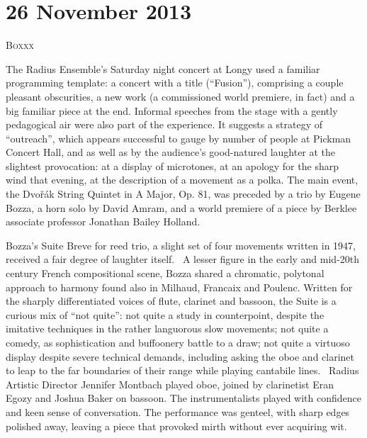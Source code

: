 \chapter{26 November 2013}

\textsc{Boxxx}

The Radius Ensemble’s Saturday night concert at Longy used a familiar programming template: a concert with a title (“Fusion”), comprising a couple pleasant obscurities, a new work (a commissioned world premiere, in fact) and a big familiar piece at the end. Informal speeches from the stage with a gently pedagogical air were also part of the experience. It suggests a strategy of “outreach”, which appears successful to gauge by number of people at Pickman Concert Hall, and as well as by the audience’s good-natured laughter at the slightest provocation: at a display of microtones, at an apology for the sharp wind that evening, at the description of a movement as a polka. The main event, the Dvořák String Quintet in A Major, Op. 81, was preceded by a trio by Eugene Bozza, a horn solo by David Amram, and a world premiere of a piece by Berklee associate professor Jonathan Bailey Holland.

Bozza’s Suite Breve for reed trio, a slight set of four movements written in 1947, received a fair degree of laughter itself.  A lesser figure in the early and mid-20th century French compositional scene, Bozza shared a chromatic, polytonal approach to harmony found also in Milhaud, Francaix and Poulenc. Written for the sharply differentiated voices of flute, clarinet and bassoon, the Suite is a curious mix of “not quite”: not quite a study in counterpoint, despite the imitative techniques in the rather languorous slow movements; not quite a comedy, as sophistication and buffoonery battle to a draw; not quite a virtuoso display despite severe technical demands, including asking the oboe and clarinet to leap to the far boundaries of their range while playing cantabile lines.  Radius Artistic Director Jennifer Montbach played oboe, joined by clarinetist Eran Egozy and Joshua Baker on bassoon. The instrumentalists played with confidence and keen sense of conversation. The performance was genteel, with sharp edges polished away, leaving a piece that provoked mirth without ever acquiring wit.

